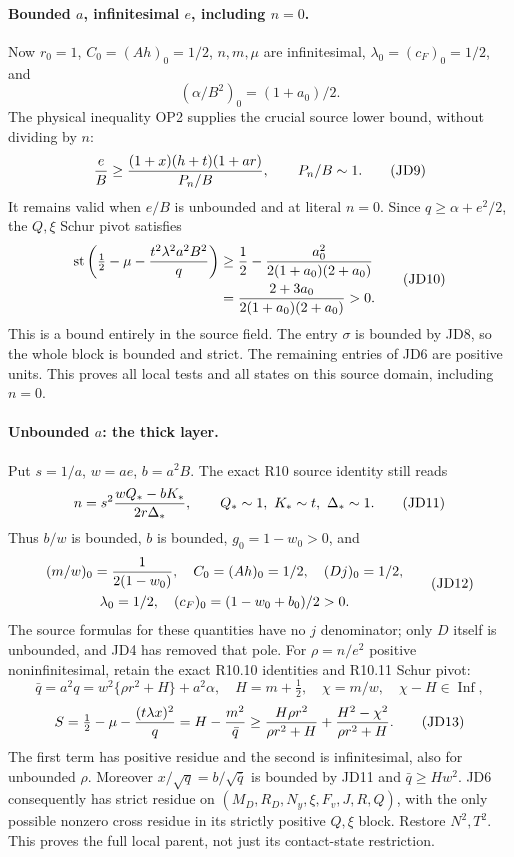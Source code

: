 \paragraph{Bounded $a$, infinitesimal $e$, including $n=0$.}
Now $r_0=1$, $C_0=(Ah)_0=1/2$, $n,m,\mu$ are infinitesimal,
$\lambda_0=(c_F)_0=1/2$, and
\[
                    (\alpha/B^2)_0=(1+a_0)/2.         \tag{JD8}
\]
The physical inequality OP2 supplies the crucial source lower bound,
without dividing by $n$:
\[
 {e\over B}\ge
 {(1+x)(h+t)(1+ar)\over P_n/B},\qquad P_n/B\sim1.
                                                               \tag{JD9}
\]
It remains valid when $e/B$ is unbounded and at literal $n=0$.
Since $q\ge\alpha+e^2/2$, the $Q,\xi$ Schur pivot satisfies
\[
 \begin{split}
 \operatorname{st}\left(\tfrac12-\mu
                 -{t^2\lambda^2a^2B^2\over q}\right)
 &\ge {1\over2}-{a_0^2\over2(1+a_0)(2+a_0)}\\
 &= {2+3a_0\over2(1+a_0)(2+a_0)}>0.                  
 \end{split}\tag{JD10}
\]
This is a bound entirely in the source field.  The entry $\sigma$
is bounded by JD8, so the whole block is bounded and strict.
The remaining entries of JD6 are positive units.  This proves all
local tests and all states on this source domain, including $n=0$.

\paragraph{Unbounded $a$: the thick layer.}
Put $s=1/a$, $w=ae$, $b=a^2B$.  The exact R10 source identity
still reads
\[
 n=s^2{wQ_*-bK_*\over2r\Delta_*},\qquad
 Q_*\sim1,\ K_*\sim t,\ \Delta_*\sim1.             \tag{JD11}
\]
Thus $b/w$ is bounded, $b$ is bounded, $g_0=1-w_0>0$, and
\[
\begin{gathered}
 (m/w)_0={1\over2(1-w_0)},\quad C_0=(Ah)_0=1/2,
 \quad (Dj)_0=1/2,\\ \lambda_0=1/2,
 \quad(c_F)_0=(1-w_0+b_0)/2>0.
\end{gathered}                       \tag{JD12}
\]
The source formulas for these quantities have no $j$ denominator;
only $D$ itself is unbounded, and JD4 has removed that pole.
For $\rho=n/e^2$ positive noninfinitesimal, retain the exact R10.10
identities and R10.11 Schur pivot:
\[
 \bar q=a^2q=w^2\{\rho r^2+H\}+a^2\alpha,
 \quad H=m+\tfrac12,\quad \chi=m/w,
 \quad \chi-H\in\operatorname{Inf},
\]
\[
 S=\tfrac12-\mu-{(t\lambda x)^2\over q}
 =H-{m^2\over\bar q}
 \ge {H\rho r^2\over\rho r^2+H}
       +{H^2-\chi^2\over\rho r^2+H}.                 \tag{JD13}
\]
The first term has positive residue and the second is infinitesimal,
also for unbounded $\rho$.  Moreover $x/\sqrt q=b/\sqrt{\bar q}$
is bounded by JD11 and $\bar q\ge Hw^2$.  JD6 consequently has
strict residue on $(M_D,R_D,N_y,\xi,F_v,J,R,Q)$, with the only
possible nonzero cross residue in its strictly positive $Q,\xi$
block.  Restore $N^2,T^2$.  This proves the full local parent, not
just its contact-state restriction.

